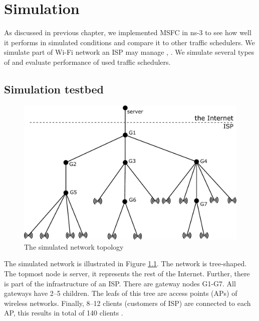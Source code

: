 \chapter{Simulation}
\label{chap3}
As discussed in previous chapter, we implemented MSFC in ns-3 to see how well it performs in simulated conditions and compare it to other traffic schedulers.  We simulate  part of Wi-Fi network  an ISP may manage , . We simulate several types of  and evaluate  performance of  used traffic schedulers. 

\section{Simulation testbed}
\label{testbed}
\begin{figure}
	\centering
	\includegraphics[width=137mm]{drawings/layout}
	\caption{The simulated network topology}
	\label{fig11:sim_layout}
\end{figure}


The simulated network is illustrated in Figure \ref{fig11:sim_layout}. The network is tree-shaped. The topmost node is server, it represents  the rest of the Internet. Further, there is part of the infrastructure of an ISP. There are gateway nodes G1-G7. All gateways have 2--5 children. The leafs of this tree are access points (APs) of wireless networks. Finally, 8--12 clients (customers of ISP) are connected to each AP,  this results in total of 140 clients .

